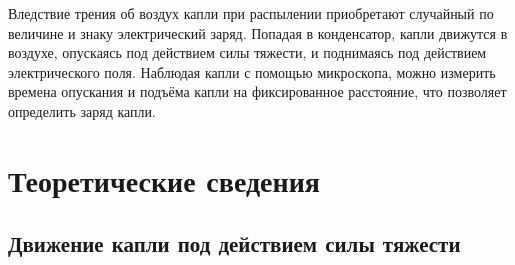 \documentclass[14pt, a4paper,reqno]{article}
\begin{document}
    Вледствие трения об воздух капли при распылении приобретают случайный по величине
    и знаку электрический заряд. Попадая в конденсатор, капли движутся в воздухе, 
    опускаясь под действием силы тяжести, и поднимаясь под действием электрического поля.
    Наблюдая капли с помощью микроскопа, можно измерить времена опускания и подъёма капли
    на фиксированное расстояние, что позволяет определить заряд капли.

\section{Теоретические сведения}

\subsection{Движение капли под действием силы тяжести}
\end{document}
